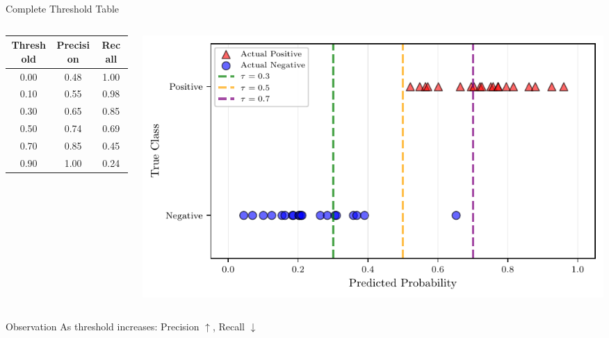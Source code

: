 \documentclass{beamer}
\begin{document}
\begin{frame}{Complete Threshold Table}
\begin{columns}
\begin{column}{0.48\textwidth}
\begin{center}
\small
\begin{tabular}{|c|c|c|}
\hline
\textbf{Threshold} & \textbf{Precision} & \textbf{Recall} \\
\hline
0.00 & 0.48 & 1.00 \\
\hline
0.10 & 0.55 & 0.98 \\
\hline
0.30 & 0.65 & 0.85 \\
\hline
0.50 & 0.74 & 0.69 \\
\hline
0.70 & 0.85 & 0.45 \\
\hline
0.90 & 1.00 & 0.24 \\
\hline
\end{tabular}
\end{center}
\end{column}
\begin{column}{0.48\textwidth}
\includegraphics[width=\textwidth]{threshold-effect-diagram.pdf}
\end{column}
\end{columns}

\vspace{0.2cm}

\begin{keypointsbox}{Observation}
\small
As threshold increases: Precision $\uparrow$, Recall $\downarrow$
\end{keypointsbox}
\end{frame}
\end{document}
